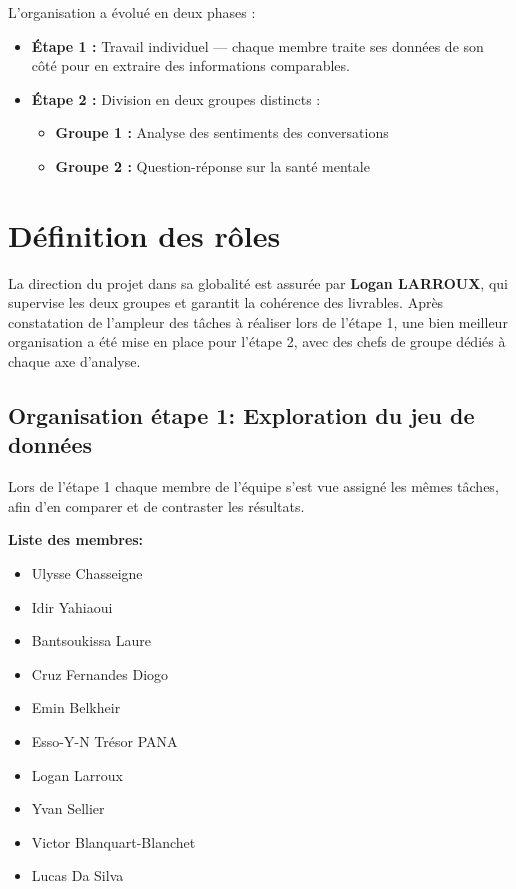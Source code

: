 \documentclass[12pt,a4paper]{report}
\begin{document}
L'organisation a évolué en deux phases :
\begin{itemize}
    \item \textbf{Étape 1 :} Travail individuel — chaque membre traite ses données de son côté pour en extraire des informations comparables.
    \item \textbf{Étape 2 :} Division en deux groupes distincts :
    \begin{itemize}
        \item \textbf{Groupe 1 :} Analyse des sentiments des conversations
        \item \textbf{Groupe 2 :} Question-réponse sur la santé mentale
    \end{itemize}
\end{itemize}

\section{Définition des rôles}
La direction du projet dans sa globalité est assurée par \textbf{Logan LARROUX}, 
qui supervise les deux groupes et garantit la cohérence des livrables.
Après constatation de l'ampleur des tâches à réaliser lors de l'étape 1, une bien meilleur organisation a été mise en place pour l'étape 2, avec des chefs de groupe dédiés à chaque axe d'analyse.

\subsection{Organisation étape 1: Exploration du jeu de données}
Lors de l'étape 1 chaque membre de l'équipe s'est vue assigné les mêmes tâches, afin d'en comparer et de contraster les résultats.

\textbf{Liste des membres: }
\begin{itemize}
    \item Ulysse Chasseigne
    \item Idir Yahiaoui
    \item Bantsoukissa Laure
    \item Cruz Fernandes Diogo
    \item Emin Belkheir
    \item Esso-Y-N Trésor PANA
    \item Logan Larroux
    \item Yvan Sellier
    \item Victor Blanquart-Blanchet
    \item Lucas Da Silva
\end{itemize}
\end{document}
